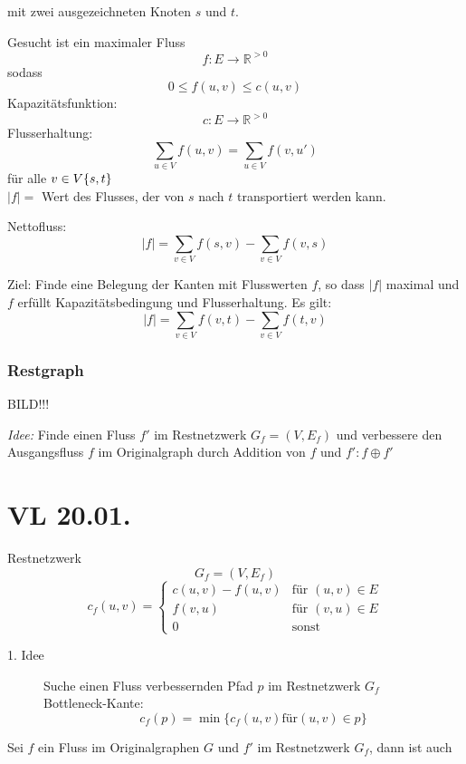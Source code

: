 \documentclass[a4paper,draft,twoside,10pt]{report}
\begin{document}
mit zwei ausgezeichneten Knoten $s$ und $t$.

Gesucht ist ein maximaler Fluss
\[f:E\rightarrow \mathbb R^{>0}\]
sodass
\[0\le f(u,v)\le c(u,v)\]
Kapazitätsfunktion:
\[c:E\rightarrow \mathbb R^{>0}\]
Flusserhaltung:
\[\sum_{u\in V}f(u,v) = \sum_{u\in V} f(v,u')\]
für alle $v\in V\/\{s,t\}$\\
$|f|=$ Wert des Flusses, der von $s$ nach $t$ transportiert werden kann.

Nettofluss:
\[|f|=\sum_{v\in V}f(s,v) -\sum_{v\in V} f(v,s) \]

Ziel: Finde eine Belegung der Kanten mit Flusswerten $f$, so dass $|f|$ maximal und $f$ erfüllt Kapazitätsbedingung und Flusserhaltung.
Es gilt:
\[|f|=\sum_{v\in V} f(v,t) - \sum_{v\in V} f(t,v)\]

\subsection{Restgraph}
BILD!!!

\textit{Idee:} Finde einen Fluss $f'$ im Restnetzwerk $G_f=(V,E_f)$ und verbessere den Ausgangsfluss $f$ im Originalgraph durch Addition von $f$ und $f':f\oplus f'$




\chapter{VL 20.01.}
Restnetzwerk
\[G_f=(V,E_f)\]
\[c_f(u,v)=\left\{\begin{array}{ll}
c(u,v)-f(u,v)&\mbox{für } (u,v)\in E\\
f(v,u)&\mbox{für } (v,u)\in E\\
0&\mbox{sonst}
\end{array}\right.\]

\begin{description}
\item[1. Idee] Suche einen Fluss verbessernden Pfad $p$ im Restnetzwerk $G_f$\\
Bottleneck-Kante:\[c_f(p)=\min\{c_f(u,v) \mbox{für} (u,v)\in p\}\]
\end{description}

Sei $f$ ein Fluss im Originalgraphen $G$ und $f'$ im Restnetzwerk $G_f$, dann ist auch 
\end{document}
